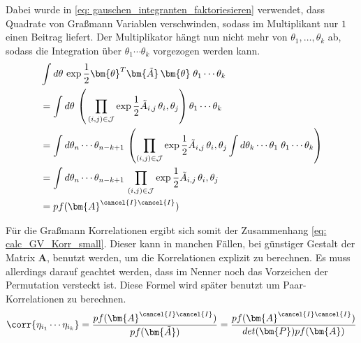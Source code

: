 \noindent Dabei wurde in \eqref{eq: gauschen_integranten_faktoriesieren} verwendet, dass Quadrate von Graßmann Variablen verschwinden, sodass im Multiplikant nur $1$ einen Beitrag liefert.  
Der Multiplikator hängt nun nicht mehr von $\theta_{1},\dots,\theta_k$ ab, sodass die Integration über $\theta_{1}\cdots\theta_k$ vorgezogen werden kann.
\begin{align}
    &\int d\theta\, \exp{ \frac{1}{2} \bm{\theta}^T \bm{\tilde{A}}\, \bm{\theta}\;}  \theta_{1}\cdots\theta_k \nonumber\\
    &=\int d\theta\, \left(\, \prod_{(i,j) \in \mathcal{J}} \exp{ \frac{1}{2} \tilde A_{i,j}\, \theta_i, \theta_j}\right) \theta_{1}\cdots\theta_k \nonumber \\
    &=  \int d\theta_n \cdots \theta_{n-k+1} \, \left(\prod_{(i,j) \in \mathcal{J}} \exp{ \frac{1}{2} \tilde A_{i,j}\, \theta_i, \theta_j} \int d\theta_k \cdots \theta_{1} \; \theta_{1}\cdots\theta_k \right) \nonumber \\
    &=  \int d\theta_n \cdots \theta_{n-k+1} \, \prod_{(i,j) \in \mathcal{J}} \exp{ \frac{1}{2} \tilde A_{i,j}\, \theta_i, \theta_j} \nonumber \\
    &= pf(\bm{A}^{\cancel{I} \cancel{I}}) \nonumber
\end{align}

\noindent Für die Graßmann Korrelationen ergibt sich somit der Zusammenhang \eqref{eq: calc_GV_Korr_small}. Dieser kann in manchen Fällen, bei günstiger Gestalt der Matrix $\bm{A}$, benutzt werden, um die Korrelationen explizit zu berechnen. Es muss allerdings darauf geachtet werden, dass im Nenner noch das Vorzeichen der Permutation versteckt ist. Diese Formel wird später benutzt um Paar-Korrelationen zu berechnen. 
\begin{equation}
\corr{\eta_{i_1} \cdots \eta_{i_k}}  = \frac{pf(\bm{A}^{\cancel{I} \cancel{I}}) }{pf(\bm{\tilde{A}})} = \frac{pf(\bm{A}^{\cancel{I} \cancel{I}}) }{det(\bm{P}) pf(\bm{A})} \label{eq: calc_GV_Korr_small}
\end{equation}

